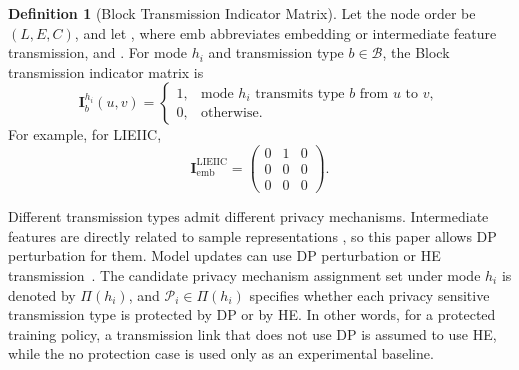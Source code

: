 ﻿\documentclass[preprint,12pt]{elsarticle}
\theoremstyle{plain}
\theoremstyle{definition}
\newtheorem{definition}[theorem]{Definition}
\theoremstyle{remark}
\begin{document}
\begin{definition}[Block Transmission Indicator Matrix]
Let the node order be \((L,E,C)\), and let , where \(\mathrm{emb}\) abbreviates embedding or intermediate feature transmission,  and .
For mode \(h_i\) and transmission type \(b\in\mathcal{B}\), the Block transmission indicator matrix is
\begin{equation}
    \mathbf{I}_{b}^{h_i}(u,v)=
    \begin{cases}
    1, & \text{mode } h_i \text{ transmits type } b \text{ from } u \text{ to } v,\\
    0, & \text{otherwise}.
    \end{cases}
\end{equation}
For example, for LIEIIC,
\begin{equation}
\mathbf{I}_{\mathrm{emb}}^{\mathrm{LIEIIC}}=
\begin{pmatrix}
0 & 1 & 0\\
0 & 0 & 0\\
0 & 0 & 0
\end{pmatrix}.
\end{equation}
\end{definition}

Different transmission types admit different privacy mechanisms.
Intermediate features  are directly related to sample representations , so this paper allows DP perturbation for them.
Model updates can use DP perturbation or HE transmission~\cite{PPHFL}.
The candidate privacy mechanism assignment set under mode \(h_i\) is denoted by \(\Pi(h_i)\), and \(\mathcal{P}_i\in\Pi(h_i)\) specifies whether each privacy sensitive transmission type is protected by DP or by HE.
In other words, for a protected training policy, a transmission link that does not use DP is assumed to use HE, while the no protection case is used only as an experimental baseline.
\end{document}
